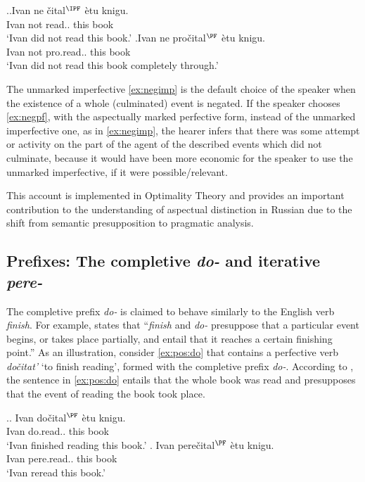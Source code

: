 \ex.\ag.\label{ex:negimp}Ivan ne \v{c}ital$^{\IPF}$ \`{e}tu knigu.\\
Ivan not read.. this book\\
\trans `Ivan did not read this book.'
\bg.\label{ex:negpf}Ivan ne pro\v{c}ital$^{\PF}$ \`{e}tu knigu.\\
Ivan not pro.read.. this book\\
\trans `Ivan did not read this book completely through.'\\

The unmarked imperfective \ref{ex:negimp} is the default choice of the speaker when the existence of a whole (culminated) event is negated.
If the speaker chooses \ref{ex:negpf}, with the aspectually marked perfective form, instead of the unmarked imperfective one, as in \ref{ex:negimp}, the hearer infers that there was some attempt or activity on the part of the agent of the described events which did not culminate, because it would have been more economic for the speaker to use the unmarked imperfective, if it were possible/relevant.

This account is implemented in Optimality Theory \citep{Blutner:00} and provides an important contribution to the understanding of aspectual distinction in Russian due to the shift from semantic presupposition to pragmatic analysis.

\subsection{Prefixes: The completive \textit{do-} and iterative \textit{pere-}}\label{sec:pragm:old:pref}
The completive prefix \textit{do-} is claimed to behave similarly to the English verb \textit{finish}. For example, \citet[75]{Kagan:book} states that ``\textit{finish} and \textit{do-} presuppose that a particular event begins, or takes place partially, and entail that it reaches a certain finishing point.'' As an illustration, consider \ref{ex:pos:do} that contains a perfective verb \textit{do\v{c}itat'} `to finish reading', formed with the completive prefix \textit{do-}. According to \citet{Kagan:book}, the sentence in \ref{ex:pos:do} entails that the whole book was read and presupposes that the event of reading the book took place.

\ex.\ag. \label{ex:pos:do}Ivan do\v{c}ital$^{\PF}$ \`{e}tu knigu.\\
Ivan do.read.. this book\\
\trans `Ivan finished reading this book.'
\bg. \label{ex:pos:pere}Ivan pere\v{c}ital$^{\PF}$ \`{e}tu knigu.\\
Ivan pere.read.. this book\\
\trans `Ivan reread this book.'

